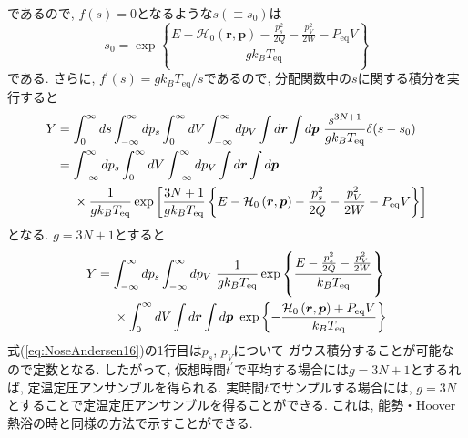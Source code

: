 であるので, $f(s)=0$となるような$s(\equiv s_{0})$は
\begin{equation}
 s_{0}
  = \exp \left\{
         \frac{
               E - \mathcal{H}_{0} \left(\bm{r}, \bm{p} \right)
	      - \frac{p_{s}^2}{2Q} - \frac{p_{V}^{2}}{2W}
	      -  P_{\mathrm{eq}} V
	      }
              {g k_{B} T_{\mathrm{eq}}}
	 \right\}
 \label{eq:NoseAndersen14}
\end{equation}
である. 
さらに, $f^{\prime}(s)=g k_{B} T_{\mathrm{eq}} / s$であるので, 
分配関数中の$s$に関する積分を実行すると
\begin{align}
Y
 &=
 \int_{0}^{\infty} d s
 \int_{-\infty}^{\infty} d p_{s}
 \int_{0}^{\infty} d V
 \int_{-\infty}^{\infty} d p_{V}
 \int d \bm{r}
 \int d \bm{p} ~
 \frac{s^{3N+1}}{g k_{B} T_{\mathrm{eq}}}
 \delta (s - s_{0})
 \notag
 \\
 &=
 \int_{-\infty}^{\infty} d p_{s}
 \int_{0}^{\infty} d V
 \int_{-\infty}^{\infty} d p_{V}
 \int d \bm{r}
 \int d \bm{p}
 \notag
 \\
 &~~~~\times
 \frac{1}{g k_{B} T_{\mathrm{eq}}}
 \exp \left[
         \frac{3N+1}{g k_{B} T_{\mathrm{eq}}}
         \left\{
                E - \mathcal{H}_{0} \left(\bm{r}, \bm{p} \right)
 	      - \frac{p_{s}^2}{2Q} - \frac{p_{V}^{2}}{2W}
	      -  P_{\mathrm{eq}} V
         \right\}
	 \right]
 \label{eq:NoseAndersen15}
\end{align}
となる. 
$g=3N+1$とすると
\begin{align}
 Y
 &=
 \int_{-\infty}^{\infty} d p_{s}
 \int_{-\infty}^{\infty} d p_{V} ~
 \frac{1}{g k_{B} T_{\mathrm{eq}}}
 \exp \left\{
      \frac{E  - \frac{p_{s}^2}{2Q} - \frac{p_{V}^{2}}{2W}}{k_{B} T_{\mathrm{eq}}}
      \right\}
 \notag
 \\
 &~~~~\times
 \int_{0}^{\infty} d V
 \int d \bm{r}
 \int d \bm{p} ~
 \exp \left\{
           - \frac{ \mathcal{H}_{0} \left(\bm{r}, \bm{p} \right)
                   + P_{\mathrm{eq}} V
             }
             {k_{B} T_{\mathrm{eq}}}
        \right\}
\label{eq:NoseAndersen16}
\end{align}
式(\ref{eq:NoseAndersen16})の1行目は$p_{s}$, $p_{V}$について
ガウス積分することが可能なので定数となる. 
したがって, 仮想時間$t^{\prime}$で平均する場合には$g=3N+1$とするれば, 定温定圧アンサンブルを得られる. 
実時間$t$でサンプルする場合には, $g=3N$とすることで定温定圧アンサンブルを得ることができる. 
これは, 能勢・Hoover熱浴の時と同様の方法で示すことができる. 


